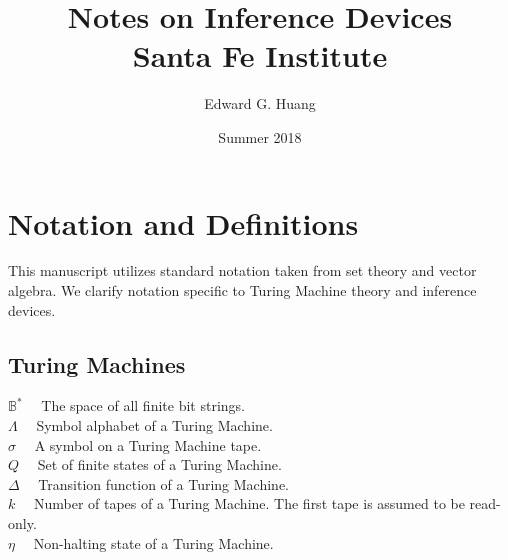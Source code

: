\documentclass[11pt]{article}
\title{
  Notes on Inference Devices \\
  \large Santa Fe Institute}
\author{Edward G. Huang}
\date{Summer 2018}
\newcommand{\B}{\mathbb{B}}
\begin{document}
\maketitle 

\section{Notation and Definitions} 

This manuscript utilizes standard notation taken from set theory and vector algebra. We clarify notation specific to Turing Machine theory and inference devices. \\


\subsection{Turing Machines} 

$ \B^{*} \quad $ The space of all finite bit strings. \\
$ \Lambda \quad $ Symbol alphabet of a Turing Machine. \\
$ \sigma \quad $ A symbol on a Turing Machine tape. \\
$ Q \quad $ Set of finite states of a Turing Machine. \\
$ \Delta \quad $ Transition function of a Turing Machine. \\
$ k \quad $ Number of tapes of a Turing Machine. The first tape is assumed to be read-only. \\
$ \eta \quad $ Non-halting state of a Turing Machine. \\
\end{document}

